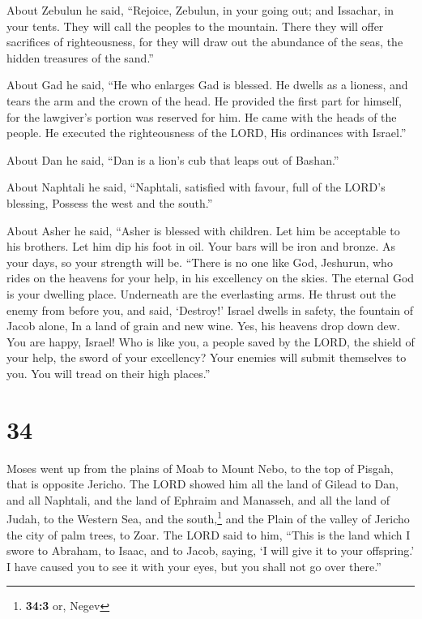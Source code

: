  About Zebulun he said, ``Rejoice, Zebulun, in your going
out; and Issachar, in your tents.  They will call the
peoples to the mountain. There they will offer sacrifices of
righteousness, for they will draw out the abundance of the seas, the
hidden treasures of the sand.''

 About Gad he said, ``He who enlarges Gad is blessed. He
dwells as a lioness, and tears the arm and the crown of the head.
 He provided the first part for himself, for the
lawgiver's portion was reserved for him. He came with the heads of the
people. He executed the righteousness of the LORD, His ordinances with
Israel.''

 About Dan he said, ``Dan is a lion's cub that leaps out
of Bashan.''

 About Naphtali he said, ``Naphtali, satisfied with
favour, full of the LORD's blessing, Possess the west and the south.''

 About Asher he said, ``Asher is blessed with children.
Let him be acceptable to his brothers. Let him dip his foot in oil.
 Your bars will be iron and bronze. As your days, so your
strength will be.  ``There is no one like God, Jeshurun,
who rides on the heavens for your help, in his excellency on the skies.
 The eternal God is your dwelling place. Underneath are
the everlasting arms. He thrust out the enemy from before you, and said,
`Destroy!'  Israel dwells in safety, the fountain of
Jacob alone, In a land of grain and new wine. Yes, his heavens drop down
dew.  You are happy, Israel! Who is like you, a people
saved by the LORD, the shield of your help, the sword of your
excellency? Your enemies will submit themselves to you. You will tread
on their high places.''

\hypertarget{section-33}{%
\section{34}\label{section-33}}

 Moses went up from the plains of Moab to Mount Nebo, to
the top of Pisgah, that is opposite Jericho. The LORD showed him all the
land of Gilead to Dan,  and all Naphtali, and the land of
Ephraim and Manasseh, and all the land of Judah, to the Western Sea,
 and the south,\footnote{\textbf{34:3} or, Negev} and the
Plain of the valley of Jericho the city of palm trees, to Zoar.
 The LORD said to him, ``This is the land which I swore to
Abraham, to Isaac, and to Jacob, saying, `I will give it to your
offspring.' I have caused you to see it with your eyes, but you shall
not go over there.''

